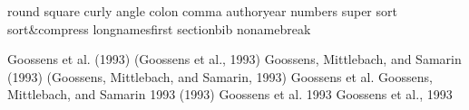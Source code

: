 
\usepackage[sort&compress]{natbib}


round	 	%
square	 	%
curly 		%
angle 		%
colon	 	%
comma 		%
authoryear 	%
numbers 	%
super 		%
sort 		%
sort&compress 	%
longnamesfirst 	%
sectionbib 	%
nonamebreak 	%

%



\citep[e.g.][page 3]{Foster2014} 

%
\citet{goossens93} 	Goossens et al. (1993) %
\citep{goossens93} 	(Goossens et al., 1993) %
\citet*{goossens93} 	Goossens, Mittlebach, and Samarin (1993)
\citep*{goossens93} 	(Goossens, Mittlebach, and Samarin, 1993)
\citeauthor{goossens93} Goossens et al.
\citeauthor*{goossens93}Goossens, Mittlebach, and Samarin
\citeyear{goossens93} 	1993
\citeyearpar{goossens93}(1993)
\citealt{goossens93} 	Goossens et al. 1993
\citealp{goossens93} 	Goossens et al., 1993


